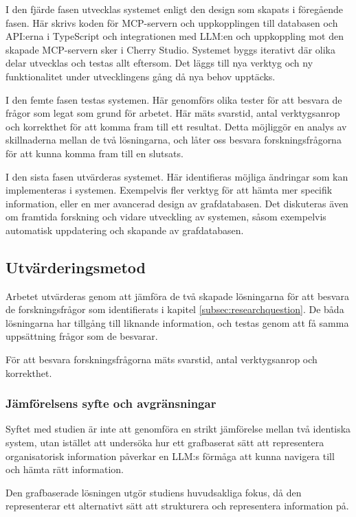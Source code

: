I den fjärde fasen utvecklas systemet enligt den design som skapats i föregående fasen.
Här skrivs koden för MCP-servern och uppkopplingen till databasen och API:erna i TypeScript och integrationen med LLM:en och uppkoppling mot den skapade MCP-servern sker i Cherry Studio.
Systemet byggs iterativt där olika delar utvecklas och testas allt eftersom.
Det läggs till nya verktyg och ny funktionalitet under utvecklingens gång då nya behov upptäcks.

I den femte fasen testas systemen. Här genomförs olika tester för att besvara de frågor som legat som grund för arbetet.
Här mäts svarstid, antal verktygsanrop och korrekthet för att komma fram till ett resultat.
Detta möjliggör en analys av skillnaderna mellan de två lösningarna, och låter oss besvara forskningsfrågorna för att kunna komma fram till en slutsats.

I den sista fasen utvärderas systemet. Här identifieras möjliga ändringar som kan implementeras i systemen. Exempelvis fler verktyg för att hämta mer specifik information, eller en mer avancerad design av grafdatabasen.
Det diskuteras även om framtida forskning och vidare utveckling av systemen, såsom exempelvis automatisk uppdatering och skapande av grafdatabasen. 


\subsection{Utvärderingsmetod}\label{subsec:evalmethod}
Arbetet utvärderas genom att jämföra de två skapade lösningarna för att besvara de forskningsfrågor som identifierats i kapitel \ref{subsec:researchquestion}.
De båda lösningarna har tillgång till liknande information, och testas genom att få samma uppsättning frågor som de besvarar.

För att besvara forskningsfrågorna mäts svarstid, antal verktygsanrop och korrekthet. 

\subsubsection{Jämförelsens syfte och avgränsningar}

Syftet med studien är inte att genomföra en strikt jämförelse mellan två identiska system, utan istället att undersöka hur ett grafbaserat sätt att representera organisatorisk information påverkar en LLM:s förmåga att kunna navigera till och hämta rätt information.

Den grafbaserade lösningen utgör studiens huvudsakliga fokus, då den representerar ett alternativt sätt att strukturera och representera information på.

